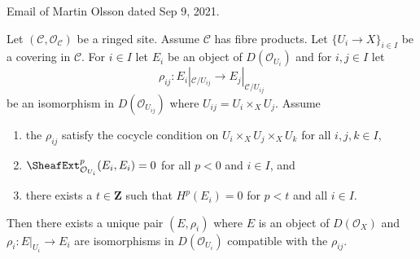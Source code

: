 \begin{lemma}
\label{lemma-bbd-glueing-cech}
\begin{reference}
Email of Martin Olsson dated Sep 9, 2021.
\end{reference}
Let $(\mathcal{C}, \mathcal{O}_\mathcal{C})$ be a ringed site.
Assume $\mathcal{C}$ has fibre products.
Let $\{U_i \to X\}_{i \in I}$ be a covering in $\mathcal{C}$.
For $i \in I$ let $E_i$ be an object of $D(\mathcal{O}_{U_i})$ and
for $i, j \in I$ let
$$
\rho_{ij} : E_i|_{\mathcal{C}/U_{ij}} \longrightarrow E_j|_{\mathcal{C}/U_{ij}}
$$
be an isomorphism in $D(\mathcal{O}_{U_{ij}})$ where
$U_{ij} = U_i \times_X U_j$. Assume
\begin{enumerate}
\item the $\rho_{ij}$ satisfy the cocycle condition on
$U_i \times_X U_j \times_X U_k$ for all $i, j, k \in I$,
\item $\SheafExt^p_{\mathcal{O}_{U_i}}(E_i, E_i) = 0$
for all $p < 0$ and $i \in I$, and
\item there exists a $t \in \mathbf{Z}$ such that
$H^p(E_i) = 0$ for $p < t$ and all $i \in I$.
\end{enumerate}
Then there exists a unique pair $(E, \rho_i)$ where $E$ is an object of 
$D(\mathcal{O}_X)$ and $\rho_i : E|_{U_i} \to E_i$ are isomorphisms in
$D(\mathcal{O}_{U_i})$ compatible with the $\rho_{ij}$.
\end{lemma}

